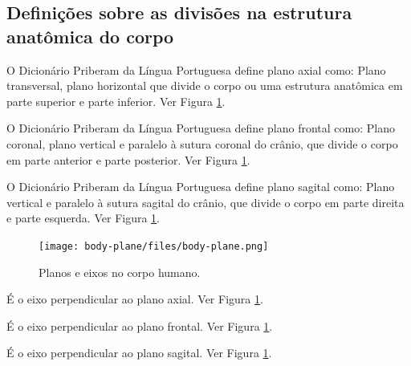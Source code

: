 \subsection{Definições sobre as divisões na estrutura anatômica do corpo }
\begin{definition} 
\label{def:PlanoAxial}
O Dicionário Priberam da Língua Portuguesa \cite{priberamplano} define plano axial como:
Plano transversal, plano horizontal que divide o corpo ou uma estrutura anatômica em parte superior e parte inferior.
Ver Figura \ref{fig:bodyhumanplane}.
\end{definition}

\begin{definition} 
\label{def:PlanoFrontal}
O Dicionário Priberam da Língua Portuguesa \cite{priberamplano} define plano frontal como:
Plano coronal,   plano vertical e paralelo à sutura coronal do crânio, que divide o corpo em parte anterior e parte posterior.
Ver Figura \ref{fig:bodyhumanplane}.
\end{definition}

\begin{definition} 
\label{def:PlanoSagital}
O Dicionário Priberam da Língua Portuguesa \cite{priberamplano} define plano sagital como:
Plano vertical e paralelo à sutura sagital do crânio, que divide o corpo em parte direita e parte esquerda.
Ver Figura \ref{fig:bodyhumanplane}.
\end{definition}

\begin{figure}[h!]
  \centering
    \texttt{[image: body-plane/files/body-plane.png]}
  \caption{ Planos e eixos no corpo humano.}
\label{fig:bodyhumanplane}
\end{figure}

\begin{definition} 
\label{def:EixoAxial}
É o eixo perpendicular ao plano axial.
Ver Figura \ref{fig:bodyhumanplane}.
\end{definition}

\begin{definition} 
\label{def:EixoFrontal}
É o eixo perpendicular ao plano frontal.
Ver Figura \ref{fig:bodyhumanplane}.
\end{definition}

\begin{definition} 
\label{def:EixoSagital}
É o eixo perpendicular ao plano sagital.
Ver Figura \ref{fig:bodyhumanplane}.
\end{definition}
